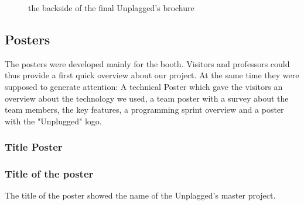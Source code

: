 \begin{figure}[!hbtp]
  \centering
  \caption{the backside of the final Unplagged's brochure}
  \label{fig:brochure_final_backside}
\end{figure}

\pagebreak 

\subsection{Posters}


The posters were developed mainly for the booth. Visitors and professors could thus provide a first quick overview about our project. At the same time they were supposed to generate attention: 
A technical Poster which gave the visitors an overview about the technology we used, 
a team poster with a survey about the team members, the key features, a programming sprint overview and a poster with the "Unplugged" logo.


\subsubsection{Title Poster}

\subsubsection{Title of the poster}
The title of the poster showed the name of the Unplagged's master project.


